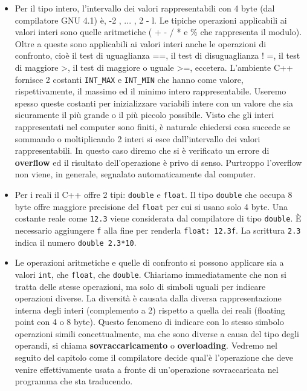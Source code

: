 \begin{itemize}
\item 
Per il tipo intero, l'intervallo dei valori rappresentabili con 4 byte (dal compilatore GNU 4.1) è, -2 , ... , 2 - l.
Le tipiche operazioni applicabili ai valori interi sono quelle aritmetiche ( + - / * e \% che rappresenta il modulo).
Oltre a queste sono applicabili ai valori interi anche le operazioni di confronto, cioè il test di uguaglianza ==, il test di disuguaglianza ! =, il test di maggiore >, il test di maggiore o uguale >=, eccetera.
L'ambiente C++ fornisce 2 costanti \texttt{INT\_MAX} e \texttt{INT\_MIN} che hanno come valore, rispettivamente, il massimo ed il minimo intero rappresentabile.
Useremo spesso queste costanti per inizializzare variabili intere con un valore che sia sicuramente il più grande o il più piccolo possibile.
Visto che gli interi rappresentati nel computer sono finiti, è naturale chiedersi cosa succede se sommando o moltiplicando 2 interi si esce dall'intervallo dei valori rappresentabili.
In questo caso diremo che si è verificato un errore di \textbf{overflow} ed il risultato dell'operazione è privo di senso.
Purtroppo l'overflow non viene, in generale, segnalato automaticamente dal computer.

\item
Per i reali il C++ offre 2 tipi: \texttt{double} e \texttt{float}.
Il tipo \texttt{double} che occupa 8 byte offre maggiore precisione del \texttt{float} per cui si usano solo 4 byte.
Una costante reale come \texttt{12.3} viene considerata dal compilatore di tipo \texttt{double}.
È necessario aggiungere \texttt{f} alla fine per renderla \texttt{float: 12.3f}.
La scrittura \texttt{2.3} indica il numero \texttt{double 2.3*10}.

\item
Le operazioni aritmetiche e quelle di confronto si possono applicare sia a valori \texttt{int}, che \texttt{float}, che \texttt{double}.
Chiariamo immediatamente che non si tratta delle stesse operazioni, ma solo di simboli uguali per indicare operazioni diverse.
La diversità è causata dalla diversa rappresentazione interna degli interi (complemento a 2) rispetto a quella dei reali (floating point con 4 o 8 byte).
Questo fenomeno di indicare con lo stesso simbolo operazioni simili concettualmente, ma che sono diverse a causa del tipo degli operandi, si chiama \textbf{sovraccaricamento} o \textbf{overloading}.
Vedremo nel seguito del capitolo come il compilatore decide qual'è l'operazione che deve venire effettivamente usata a fronte di un'operazione sovraccaricata nel programma che sta traducendo.


\end{itemize}
